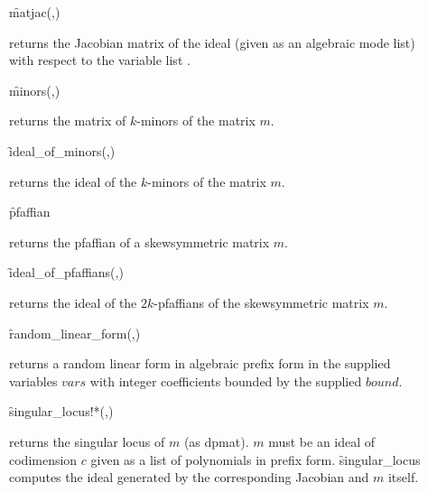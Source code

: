 \begin{description}
\item[]
  \begin{syntax}
    \f{matjac}(,)
  \end{syntax}
  \hypertarget{procedure:MATJAC}{}
returns the Jacobian matrix of the ideal  (given as an
algebraic mode list) with respect to the variable list .

\item[]
  \begin{syntax}
    \f{minors}(,)
  \end{syntax}
  \hypertarget{procedure:MINORS}{}
returns the matrix of $k$-minors of the matrix $m$.

\item[]
  \begin{syntax}
    \f{ideal\_of\_minors}(,)
  \end{syntax}
  \hypertarget{procedure:IDEAL_OF_MINORS}{}
returns the ideal of the $k$-minors of the matrix $m$.

\item[]
  \begin{syntax}
    \f{pfaffian} 
  \end{syntax}
  \hypertarget{procedure:PFAFFIAN}{}
returns the pfaffian of a skewsymmetric matrix $m$.

\item[]
  \begin{syntax}
    \f{ideal\_of\_pfaffians}(,)
  \end{syntax}
  \hypertarget{procedure:IDEAL_OF_PFAFFIANS}{}
returns the ideal of the $2k$-pfaffians of the skewsymmetric
matrix $m$.

\item[]
  \begin{syntax}
    \f{random\_linear\_form}(,)
  \end{syntax}
  \hypertarget{procedure:RANDOM_LINEAR_FORM}{}
returns a random linear form in algebraic prefix form in the
supplied variables $vars$ with integer coefficients bounded by the
supplied $bound$.

\item[]
  \begin{syntax}
    \f{singular\_locus!*}(,)
  \end{syntax}
  \hypertarget{procedure:SINGULAR_LOCUS!*}{}
returns the singular locus of $m$ (as dpmat). $m$ must be an
ideal of codimension $c$ given as a list of polynomials in prefix
form. \f{singular\_locus}
computes the ideal generated by the
corresponding Jacobian and $m$ itself.
\end{description}


